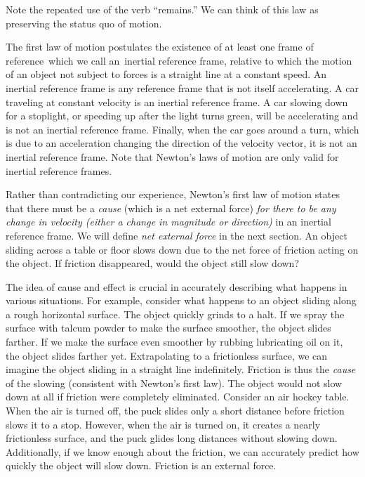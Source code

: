 \documentclass[
]{book}
\begin{document}
Note the repeated use of the verb ``remains.'' We can think of this law as
preserving the status quo of motion.

The first law of motion postulates the existence of at least one frame
of reference~which we call an~inertial reference frame, relative to
which the motion of an object not subject to forces is a straight line
at a constant speed. An inertial reference frame is any reference frame
that is not itself accelerating. A car traveling at constant velocity is
an inertial reference frame. A car slowing down for a stoplight, or
speeding up after the light turns green, will be accelerating and is not
an inertial reference frame. Finally, when the car goes around a turn,
which is due to an acceleration changing the direction of the velocity
vector, it is not an inertial reference frame. Note that Newton's laws
of motion are only valid for inertial reference frames.

Rather than contradicting our experience, {Newton's first law of
motion} states that there must be a \emph{cause} (which is
a net external force) \emph{for there to be any change in velocity (either a
change in magnitude or direction)} in an inertial reference frame. We
will define \emph{net external force} in the next section. An object sliding
across a table or floor slows down due to the net force of friction
acting on the object. If friction disappeared, would the object still
slow down?

The idea of cause and effect is crucial in accurately describing what
happens in various situations. For example, consider what happens to an
object sliding along a rough horizontal surface. The object quickly
grinds to a halt. If we spray the surface with talcum powder to make the
surface smoother, the object slides farther. If we make the surface even
smoother by rubbing lubricating oil on it, the object slides farther
yet. Extrapolating to a frictionless surface, we can imagine the object
sliding in a straight line indefinitely. Friction is thus the \emph{cause}
\emph{}of the slowing (consistent with Newton's
first law). The object would not slow down at all if friction were
completely eliminated. Consider an air hockey table. When the air is
turned off, the puck slides only a short distance before friction slows
it to a stop. However, when the air is turned on, it creates a nearly
frictionless surface, and the puck glides long distances without slowing
down. Additionally, if we know enough about the friction, we can
accurately predict how quickly the object will slow down. Friction is an
external force.
\end{document}
